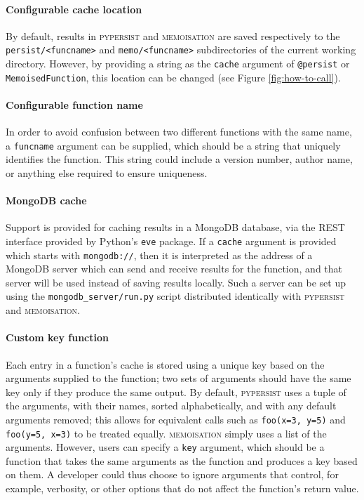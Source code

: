\documentclass{deliverablereport}
\newcommand{\pypersist}{\textsc{pypersist}}
\newcommand{\Memoisation}{\textsc{memoisation}}
\begin{document}
\paragraph{Configurable cache location}
By default, results in \pypersist{} and \Memoisation{} are saved respectively to
the \texttt{persist/<funcname>} and \texttt{memo/<funcname>} subdirectories of
the current working directory.  However, by providing a string as the
\texttt{cache} argument of \texttt{@persist} or \texttt{MemoisedFunction}, this
location can be changed (see Figure \ref{fig:how-to-call}).

\paragraph{Configurable function name}
In order to avoid confusion between two different functions with the same name,
a \texttt{funcname} argument can be supplied, which should
be a string that uniquely identifies the function.  This string could include a
version number, author name, or anything else required to ensure uniqueness.

\paragraph{MongoDB cache}
Support is provided for caching results in a MongoDB database, via the REST
interface provided by Python's \texttt{eve} package.  If a \texttt{cache}
argument is provided which starts with \texttt{mongodb://}, then it is
interpreted as the address of a MongoDB server which can send and receive
results for the function, and that server will be used instead of saving results
locally.  Such a server can be set up using the \texttt{mongodb\_server/run.py}
script distributed identically with \pypersist{} and \Memoisation{}.

\paragraph{Custom key function}
Each entry in a function's cache is stored using a unique key based on the
arguments supplied to the function; two sets of arguments should have the same
key only if they produce the same output.  By default, \pypersist{} uses a tuple of the
arguments, with their names, sorted alphabetically, and with any default arguments removed;
this allows for equivalent calls such as \texttt{foo(x=3,
  y=5)} and \texttt{foo(y=5, x=3)} to be treated equally.
\Memoisation{} simply uses a list of the arguments.  However, users can
specify a \texttt{key} argument, which should be a function
that takes the same arguments as the function and produces a key based on them.  A developer
could thus choose to ignore arguments that control, for example, verbosity, or
other options that do not affect the function's return value.
\end{document}
